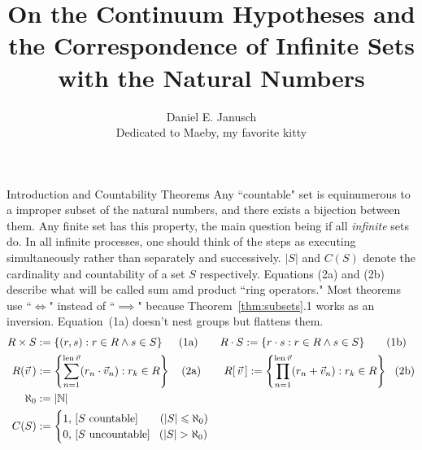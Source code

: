 \documentclass[12pt]{article}
\begin{document}
\title{On the Continuum Hypotheses and the Correspondence of Infinite Sets with the Natural Numbers}
\author{Daniel E. Janusch\\Dedicated to Maeby, my favorite kitty}
\maketitle

\begin{section}{Introduction and Countability Theorems}\label{sec:background}
	Any ``countable" set is equinumerous to a improper subset of the natural numbers, and
	there exists a bijection between them. Any finite set has this property, the main
	question being if all \emph{infinite} sets do. In all infinite processes, one should
	think of the steps as executing simultaneously rather than separately and successively.
	$|S|$ and $C(S)$ denote the cardinality and countability of a set $S$ respectively.
	Equations (2a) and (2b) describe what will be called sum amd product ``ring operators."
	Most theorems use ``$\iff$" instead of ``$\implies$" because Theorem~\ref{thm:subsets}.1
	works as an inversion. Equation~(1a) doesn't nest groups but flattens them.
	\vspace{-1em}\\
	\begin{align}
		R\times S & :=\left\{(r,s):r\in R\land s\in S\right\}~~~~(1\text a)
		\hspace{2em}
		R\cdot S:=\left\{r\cdot s:r\in R\land s\in S\right\}~~~~~\,(1\text b)\\
		R(\vec v\,) & :=\left\{\sum_{n=1}^{\text{len}\,\vec v}(r_n\cdot\vec v_n):r_k\in R\right\}~~~(2\text a)
		\hspace{2.1em}
		R[\,\vec v\,]:=\left\{\prod_{n=1}^{\text{len}\,\vec v}(r_n+\vec v_n):r_k\in R\right\}~~(2\text b)\\
		\aleph_0 & := |\mathbb N|\\
		C(S) & :=\begin{cases}
			1,\,\left[S\text{ countable}\right]\phantom{un}~~(|S|\leqslant\aleph_0)\\
			0,\,\left[S\text{ uncountable}\right]~~(|S|>\aleph_0)\\
		\end{cases}
	\end{align}


\end{section}
\end{document}
